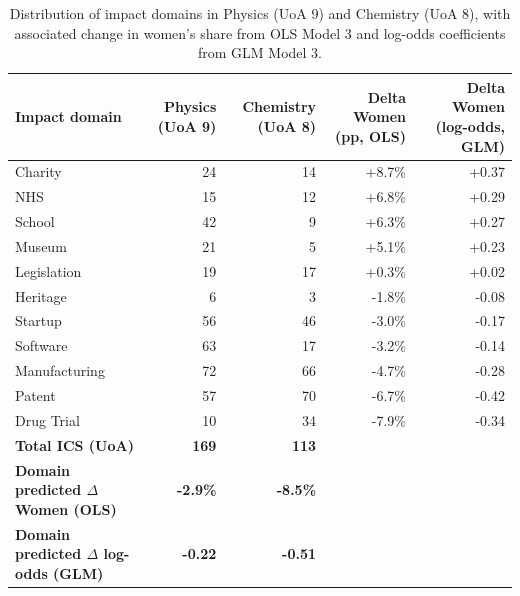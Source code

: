 \begin{table}
\caption{Distribution of impact domains in Physics (UoA 9) and Chemistry (UoA 8), with associated change in women's share from OLS Model 3 and log-odds coefficients from GLM Model 3.}
\label{tab:physics_vs_chemistry}
\begin{tabular}{lrrrr}
\toprule
Impact domain & Physics (UoA 9) & Chemistry (UoA 8) & Delta Women (pp, OLS) & Delta Women (log-odds, GLM) \\
\midrule
Charity & 24 & 14 & +8.7\% & +0.37 \\
NHS & 15 & 12 & +6.8\% & +0.29 \\
School & 42 & 9 & +6.3\% & +0.27 \\
Museum & 21 & 5 & +5.1\% & +0.23 \\
Legislation & 19 & 17 & +0.3\% & +0.02 \\
Heritage & 6 & 3 & -1.8\% & -0.08 \\
Startup & 56 & 46 & -3.0\% & -0.17 \\
Software & 63 & 17 & -3.2\% & -0.14 \\
Manufacturing & 72 & 66 & -4.7\% & -0.28 \\
Patent & 57 & 70 & -6.7\% & -0.42 \\
Drug Trial & 10 & 34 & -7.9\% & -0.34 \\
\midrule
\textbf{Total ICS (UoA)} & \textbf{169} & \textbf{113} &  &  \\
\textbf{Domain predicted $\Delta$ Women (OLS)} & \textbf{-2.9\%} & \textbf{-8.5\%} &  &  \\
\textbf{Domain predicted $\Delta$ log-odds (GLM)} & \textbf{-0.22} & \textbf{-0.51} &  &  \\
\bottomrule
\end{tabular}
\end{table}
